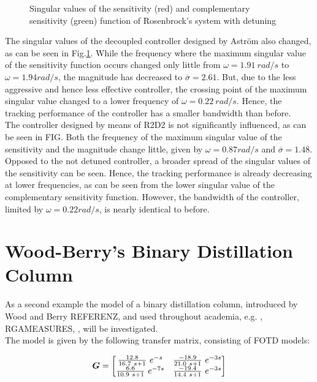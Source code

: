 \begin{figure}[H]\centering

\caption{Singular values of the sensitivity (red) and complementary sensitivity (green) function of Rosenbrock's system with detuning}
\label{c:fotd:s:rosenbrock:f:SingValDetuned}
\end{figure}

The singular values of the decoupled controller designed by Astr\"om  also changed, as can be seen in Fig.\ref{c:fotd:s:rosenbrock:f:SingValDetuned}. While the frequency where the maximum singular value of the sensitivity function occurs changed only little from $\omega = 1.91~rad/s$ to $\omega = 1.94 rad/s$, the magnitude has decreased to $\overline{\sigma} = 2.61$. But, due to the less aggressive and hence less effective controller, the crossing point of the maximum singular value changed to a lower frequency  of $\omega = 0.22~rad/s$. Hence, the tracking performance of the controller has a smaller bandwidth than before.\\

The controller designed by means of R2D2 is not significantly influenced, as can be seen in FIG. Both the frequency of the maximum singular value of the sensitivity and the magnitude change little, given by $\omega = 0.87 rad/s$ and $\overline{\sigma} = 1.48$. Opposed to the not detuned controller, a broader spread of the singular values of the sensitivity can be seen. Hence, the tracking performance is already decreasing at lower frequencies, as can be seen from the lower singular value of the complementary sensitivity function. However, the bandwidth of the controller, limited by $\omega = 0.22 rad/s$, is nearly identical to before.\\

\newpage
\section{Wood-Berry's Binary Distillation Column}%
\label{c:fotd:s:woodberry}

As a second example the model of a binary distillation column, introduced by Wood and Berry REFERENZ, and used throughout academia, e.g. \cite{Astrom2001a}, RGAMEASURES, \cite{Skogestad2005}, will be investigated.\\

The model is given by the following transfer matrix, consisting of FOTD models:

\begin{align*}
\mbox{\boldmath$G$} = \begin{bmatrix}
\frac{12.8}{16.7 ~s+1}~e^{-s}  & \frac{-18.9}{21.0 ~s+1}~e^{-3s}\\
\frac{6.6}{10.9 ~s+1}~e^{-7s} & \frac{-19.4}{14.4 ~s+1}~e^{-3s}
\end{bmatrix}
\end{align*} 

